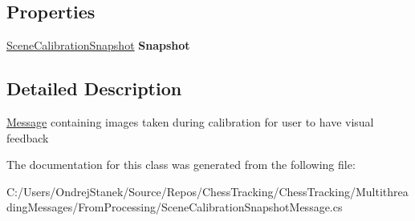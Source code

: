 \subsection*{Properties}
\begin{DoxyCompactItemize}
\item 
\mbox{\label{class_chess_tracking_1_1_multithreading_messages_1_1_from_processing_1_1_scene_calibration_snapshot_message_af4d02a741d57542148a2547a94233a69}} 
\mbox{\hyperlink{class_chess_tracking_1_1_image_processing_1_1_pipeline_data_1_1_scene_calibration_snapshot}{Scene\+Calibration\+Snapshot}} {\bfseries Snapshot}
\end{DoxyCompactItemize}


\subsection{Detailed Description}
\mbox{\hyperlink{class_chess_tracking_1_1_multithreading_messages_1_1_message}{Message}} containing images taken during calibration for user to have visual feedback 



The documentation for this class was generated from the following file\+:\begin{DoxyCompactItemize}
\item 
C\+:/\+Users/\+Ondrej\+Stanek/\+Source/\+Repos/\+Chess\+Tracking/\+Chess\+Tracking/\+Multithreading\+Messages/\+From\+Processing/Scene\+Calibration\+Snapshot\+Message.\+cs\end{DoxyCompactItemize}
